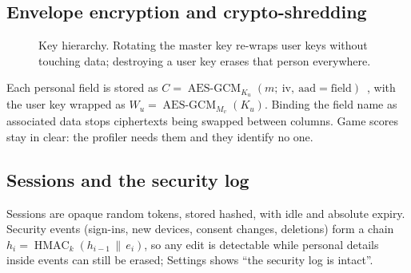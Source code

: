 \documentclass[11pt,a4paper]{article}
\begin{document}
\subsection{Envelope encryption and crypto-shredding}

\begin{figure}[H]
\centering
{}
\caption{Key hierarchy. Rotating the master key re-wraps user keys without touching data; destroying a user key erases that person everywhere.}
\label{fig:keys}
\end{figure}

Each personal field is stored as $C=\operatorname{AES\text{-}GCM}_{K_u}(m;\ \text{iv},\ \text{aad}=\text{field})$~\cite{gcm}, with the user key wrapped as $W_u=\operatorname{AES\text{-}GCM}_{M_v}(K_u)$. Binding the field name as associated data stops ciphertexts being swapped between columns. Game scores stay in clear: the profiler needs them and they identify no one.

\subsection{Sessions and the security log}
Sessions are opaque random tokens, stored hashed, with idle and absolute expiry. Security events (sign-ins, new devices, consent changes, deletions) form a chain $h_i=\operatorname{HMAC}_k(h_{i-1}\,\|\,e_i)$, so any edit is detectable while personal details inside events can still be erased; Settings shows ``the security log is intact''.
\end{document}
